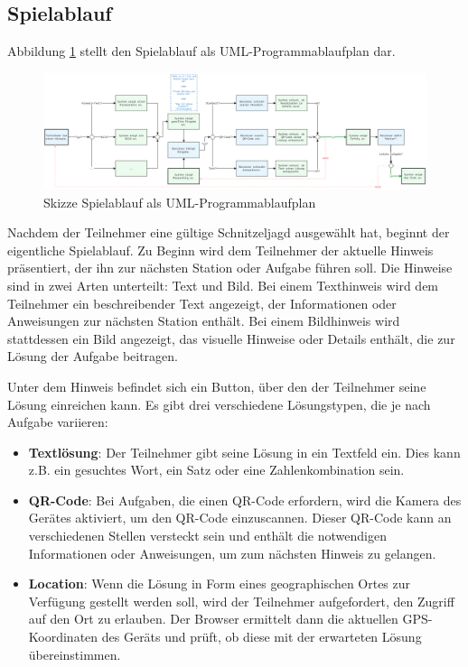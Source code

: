 \subsection{Spielablauf} \label{cha:swentwurf:spielablauf}

Abbildung \ref{fig:hunt_game_spielablauf} stellt den Spielablauf als UML-Programmablaufplan dar. 

\begin{figure}[H]
  \centering
  \includegraphics[width=\textwidth]{images/PrAr_Spielablauf.png}
  \caption{Skizze Spielablauf als UML-Programmablaufplan}
  \label{fig:hunt_game_spielablauf}
\end{figure}

Nachdem der Teilnehmer eine gültige Schnitzeljagd ausgewählt hat, beginnt der eigentliche Spielablauf. Zu Beginn wird dem Teilnehmer der aktuelle Hinweis präsentiert, der ihn zur nächsten Station oder Aufgabe führen soll. Die Hinweise sind in zwei Arten unterteilt: Text und Bild. Bei einem Texthinweis wird dem Teilnehmer ein beschreibender Text angezeigt, der Informationen oder Anweisungen zur nächsten Station enthält. Bei einem Bildhinweis wird stattdessen ein Bild angezeigt, das visuelle Hinweise oder Details enthält, die zur Lösung der Aufgabe beitragen.

Unter dem Hinweis befindet sich ein Button, über den der Teilnehmer seine Lösung einreichen kann. Es gibt drei verschiedene Lösungstypen, die je nach Aufgabe variieren:
\begin{itemize}
    \item \textbf{Textlösung}: Der Teilnehmer gibt seine Lösung in ein Textfeld ein. Dies kann z.B. ein gesuchtes Wort, ein Satz oder eine Zahlenkombination sein.

    \item \textbf{QR-Code}: Bei Aufgaben, die einen QR-Code erfordern, wird die Kamera des Gerätes aktiviert, um den QR-Code einzuscannen. Dieser QR-Code kann an verschiedenen Stellen versteckt sein und enthält die notwendigen Informationen oder Anweisungen, um zum nächsten Hinweis zu gelangen.

    \item \textbf{Location}: Wenn die Lösung in Form eines geographischen Ortes zur Verfügung gestellt werden soll, wird der Teilnehmer aufgefordert, den Zugriff auf den Ort zu erlauben. Der Browser ermittelt dann die aktuellen GPS-Koordinaten des Geräts und prüft, ob diese mit der erwarteten Lösung übereinstimmen.
\end{itemize}

